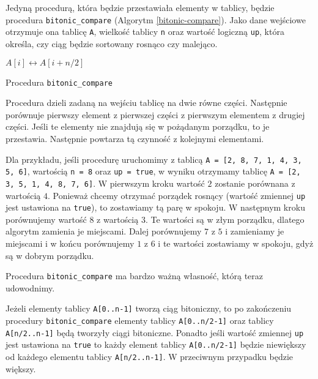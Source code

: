 Jedyną procedurą, która będzie przestawiała elementy w tablicy, będzie procedura \texttt{bitonic\_compare} (Algorytm \ref{bitonic-compare}).
Jako dane wejściowe otrzymuje ona tablicę \texttt{A}, wielkość tablicy \texttt{n} oraz wartość logiczną \texttt{up}, która określa, czy ciąg będzie sortowany rosnąco czy malejąco.
\begin{algorithm}[h]
  \DontPrintSemicolon

  
  {
    {
      $A[i] \leftrightarrow A[i+n/2]$\;
    }
  }
  \caption{Procedura \texttt{bitonic\_compare}}
  \label{bitonic-compare}
\end{algorithm}
Procedura dzieli zadaną na wejściu tablicę na dwie równe części.
Następnie porównuje pierwszy element z pierwszej części z pierwszym elementem z drugiej części.
Jeśli te elementy nie znajdują się w pożądanym porządku, to je przestawia.
Następnie powtarza tą czynność z kolejnymi elementami.

Dla przykładu, jeśli procedurę uruchomimy z tablicą \texttt{A = [2, 8, 7, 1, 4, 3, 5, 6]}, wartością \texttt{n = 8} oraz \texttt{up = true}, w wyniku otrzymamy tablicę \texttt{A = [2, 3, 5, 1, 4, 8, 7, 6]}.
W pierwszym kroku wartość $2$ zostanie porównana z wartością $4$.
Ponieważ chcemy otrzymać porządek rosnący (wartość zmiennej \texttt{up} jest ustawiona na \texttt{true}), to zostawiamy tą parę w spokoju.
W następnym kroku porównujemy wartość $8$ z wartością $3$.
Te wartości są w złym porządku, dlatego algorytm zamienia je miejscami.
Dalej porównujemy $7$ z $5$ i zamieniamy je miejscami i w końcu porównujemy $1$ z $6$ i te wartości zostawiamy w spokoju, gdyż są w dobrym porządku.

Procedura \texttt{bitonic\_compare} ma bardzo ważną własność, którą teraz udowodnimy.

\begin{theorem}
 Jeżeli elementy tablicy \texttt{A[0..n-1]} tworzą ciąg bitoniczny, to po zakończeniu procedury \texttt{bitonic\_compare} elementy tablicy \texttt{A[0..n/2-1]} oraz tablicy \texttt{A[n/2..n-1]} będą tworzyły ciągi bitoniczne.
 Ponadto jeśli wartość zmiennej \texttt{up} jest ustawiona na \texttt{true} to każdy element tablicy \texttt{A[0..n/2-1]} będzie niewiększy od każdego elementu tablicy \texttt{A[n/2..n-1]}.
 W przeciwnym przypadku będzie większy.
 \label{bitonic-theorem}
\end{theorem}

